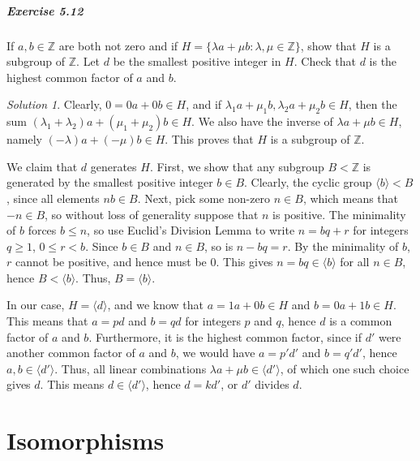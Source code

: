 \documentclass[11pt]{report}
\def\Z{\mathbb{Z}}
\theoremstyle{remark}
\newtheorem*{solution}{Solution}
\begin{document}
    \paragraph{Exercise 5.12} If $a, b \in \Z$ are both not zero and if $H =
    \{\lambda a + \mu b : \lambda, \mu \in \Z\}$, show that $H$ is a subgroup of
    $\Z$. Let $d$ be the smallest positive integer in $H$. Check that $d$ is the
    highest common factor of $a$ and $b$.
    \begin{solution}
        Clearly, $0 = 0a + 0b \in H$, and if $\lambda_1 a + \mu_1 b, \lambda_2 a +
        \mu_2 b \in H$, then the sum $(\lambda_1 + \lambda_2)a + (\mu_1 + \mu_2)b
        \in H$. We also have the inverse of $\lambda a + \mu b \in H$, namely
        $(-\lambda)a + (-\mu)b \in H$. This proves that $H$ is a subgroup of $\Z$.

        We claim that $d$ generates $H$. First, we show that any subgroup $B < \Z$ is
        generated by the smallest positive integer $b \in B$. Clearly, the cyclic
        group $\langle b\rangle < B$, since all elements $nb \in B$. Next, pick some
        non-zero $n \in B$, which means that $-n \in B$, so without loss of
        generality suppose that $n$ is positive. The minimality of $b$ forces $b
        \leq n$, so use Euclid's Division Lemma to write $n = bq + r$ for integers
        $q \geq 1$, $0 \leq r < b$. Since $b \in B$ and $n \in B$, so is $n - bq =
        r$. By the minimality of $b$, $r$ cannot be positive, and hence must be $0$.
        This gives $n = bq \in \langle b\rangle$ for all $n \in B$, hence $B <
        \langle b\rangle$. Thus, $B = \langle b \rangle$.

        In our case, $H = \langle d\rangle$, and we know that $a = 1a + 0b \in H$
        and $b = 0a + 1b \in H$. This means that $a = pd$ and $b = qd$ for integers
        $p$ and $q$, hence $d$ is a common factor of $a$ and $b$. Furthermore, it is
        the highest common factor, since if $d'$ were another common factor of $a$ and
        $b$, we would have $a = p'd'$ and $b = q'd'$, hence $a, b \in \langle
        d'\rangle$. Thus, all linear combinations $\lambda a + \mu b \in \langle
        d'\rangle$, of which one such choice gives $d$. This means $d \in \langle
        d'\rangle$, hence $d = kd'$, or $d'$ divides $d$.
    \end{solution}
    
    

    \setcounter{chapter}{6}
    \chapter{Isomorphisms}
    
\end{document}
